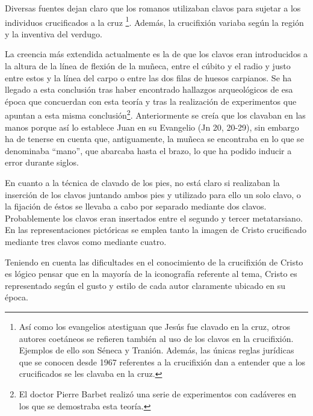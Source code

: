 Diversas fuentes dejan claro que los romanos utilizaban clavos para sujetar a los individuos crucificados a la cruz \footnote{Así como los evangelios atestiguan que Jesús fue clavado en la cruz, otros autores coetáneos se refieren también al uso de los clavos en la crucifixión. Ejemplos de ello son Séneca y Tranión. Además, las únicas reglas jurídicas que se conocen desde 1967 referentes a la crucifixión dan a entender que a los crucificados se les clavaba en la cruz.}. Además, la crucifixión variaba según la región y la inventiva del verdugo.

La creencia más extendida actualmente es la de que los clavos eran introducidos a la altura de la línea de flexión  de la muñeca, entre el cúbito y el radio y justo entre estos y la línea del carpo o entre las dos filas de huesos carpianos. Se ha llegado a esta conclusión tras haber encontrado hallazgos arqueológicos de esa época que concuerdan con esta teoría y tras la realización de experimentos que apuntan a esta misma conclusión\footnote{El doctor Pierre Barbet realizó una serie de experimentos con cadáveres en los que se demostraba esta teoría.}. Anteriormente se creía que los clavaban en las manos porque así lo establece Juan en su Evangelio (Jn 20, 20-29), sin embargo ha de tenerse en cuenta que, antiguamente, la muñeca se encontraba en lo que se denominaba ``mano'', que abarcaba hasta el brazo, lo que ha podido inducir a error durante siglos.

En cuanto a la técnica de clavado de los pies, no está claro si realizaban la inserción de los clavos juntando ambos pies y utilizado para ello un solo clavo, o la fijación de éstos se llevaba a cabo por separado mediante dos clavos. Probablemente los clavos eran insertados entre el segundo y tercer metatarsiano. En las representaciones pictóricas se emplea tanto la imagen de Cristo crucificado mediante tres clavos como mediante cuatro.

Teniendo en cuenta las dificultades en el conocimiento de la crucifixión de Cristo es lógico pensar que en la mayoría de la iconografía referente al tema, Cristo es representado según el gusto y estilo de cada autor claramente ubicado en su época.


